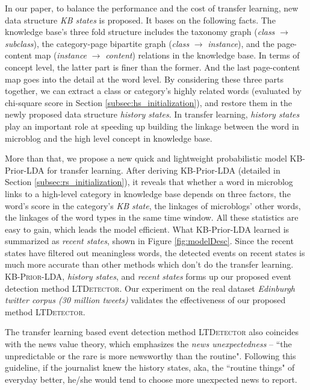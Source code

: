 \documentclass{article}
\begin{document}
In our paper, to balance the performance and the cost of transfer learning, new data structure \textit{KB states} is proposed. 
It bases on the following facts. 
The knowledge base's three fold structure includes the taxonomy graph (\textit{class} \(\rightarrow\) \textit{subclass}), the category-page bipartite graph (\textit{class} \(\rightarrow\) \textit{instance}), and the page-content map (\textit{instance} \(\rightarrow\) \textit{content}) relations in the knowledge base. 
In terms of concept level, the latter part is finer than the former. 
And the last page-content map goes into the detail at the word level. 
By considering these three parts together, we can extract a class or category's highly related words (evaluated by chi-square score in Section \ref{subsec:hs_initialization}), and restore them in the newly proposed data structure \textit{history states}.
In transfer learning, \textit{history states} play an important role at speeding up building the linkage between the word in microblog and the high level concept in knowledge base.

More than that, we propose a new quick and lightweight probabilistic model KB-Prior-LDA for transfer learning. 
After deriving KB-Prior-LDA (detailed in Section \ref{subsec:rs_initialization}), it reveals that whether a word in microblog links to a high-level category in knowledge base depends on three factors, the word's score in the category's \textit{KB state}, the linkages of microblogs' other words, the linkages of the word types in the same time window. 
All these statistics are easy to gain, which leads the model efficient. 
What KB-Prior-LDA learned is summarized as \textit{recent states}, shown in Figure \ref{fig:modelDesc}.
Since the recent states have filtered out meaningless words, the detected events on recent states is much more accurate than other methods which don't do the transfer learning.
\textsc{KB-Prior-LDA}, \textit{history states}, and \textit{recent states} forms up our proposed event detection method \textsc{LTDetector}.
Our experiment on the real dataset \textit{Edinburgh twitter corpus (30 million tweets)} validates the effectiveness of our proposed method \textsc{LTDetector}.

The transfer learning based event detection method \textsc{LTDetector} also coincides with the news value theory\cite{caple2013delving}, which emphasizes the \textit{news unexpectedness} -- ``the unpredictable or the rare is more newsworthy than the routine"\cite{bell1991language}.
Following this guideline, if the journalist knew the history states, aka, the ``routine things" of everyday better, he/she would tend to choose more unexpected news to report. 
\end{document}
